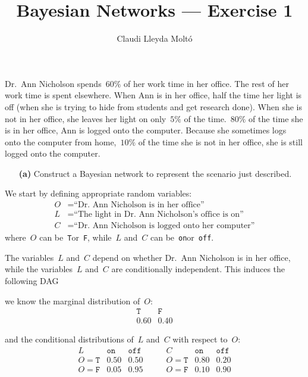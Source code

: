 \documentclass[a4paper]{article}
\title{Bayesian Networks --- Exercise 1}
\author{Claudi Lleyda Moltó}
\newcommand{\T}{\texttt{T}}
\newcommand{\F}{\texttt{F}}
\newcommand{\on}{\texttt{on}}
\newcommand{\off}{\texttt{off}}
\begin{document}
\maketitle

Dr.\ Ann Nicholson spends~\(60\%\) of her work time in her office. The rest of
her work time is spent elsewhere. When Ann is in her office, half the time her
light is off (when she is trying to hide from students and get research done).
When she is not in her office, she leaves her light on only~\(5\%\) of the
time.~\(80\%\) of the time she is in her office, Ann is logged onto the
computer.  Because she sometimes logs onto the computer from home,~\(10\%\) of
the time she is not in her office, she is still logged onto the computer.

\begin{enumerate}
    \item[\textbf{(a)}] Construct a Bayesian network to represent the scenario
        just described.
\end{enumerate}

We start by defining appropriate random variables:
\begin{align*}
    O &= \textrm{``Dr.\ Ann Nicholson is in her office''} \\
    L &= \textrm{``The light in Dr.\ Ann Nicholson's office is on''} \\
    C &= \textrm{``Dr.\ Ann Nicholson is logged onto her computer''}
\end{align*}
where~\(O\) can be~\T or~\F, while~\(L\) and~\(C\) can be~\on or~\off.

The variables~\(L\) and~\(C\) depend on whether Dr.\ Ann Nicholson is in her
office, while the variables~\(L\) and~\(C\) are conditionally independent. This
induces the following DAG

\begin{center}
\end{center}

we know the marginal distribution of~\(O\):
\[
    \begin{array}{cc}
        \T   & \F   \\ \hline
        0.60 & 0.40
    \end{array}
\]

and the conditional distributions of~\(L\) and~\(C\) with respect to~\(O\):
\[
    \begin{array}{c|cc}
        L      & \on  & \off \\ \hline
        O = \T & 0.50 & 0.50 \\
        O = \F & 0.05 & 0.95
    \end{array}
    \qquad
    \begin{array}{c|cc}
        C      & \on   & \off \\ \hline
        O = \T & 0.80  & 0.20 \\
        O = \F & 0.10  & 0.90
    \end{array}
\]
\end{document}
